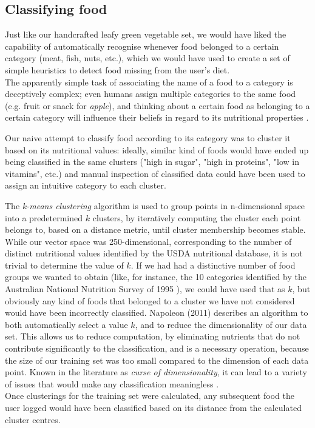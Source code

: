 \subsection{Classifying food}
Just like our handcrafted leafy green vegetable set, we would have liked the capability of automatically recognise whenever food belonged to a certain category (meat, fish, nuts, etc.), which we would have used to create a set of simple heuristics to detect food missing from the user's diet. \\
The apparently simple task of associating the name of a food to a category is deceptively complex; even humans assign multiple categories to the same food (e.g. fruit or snack for \textit{apple}), and thinking about a certain food as belonging to a certain category will influence their beliefs in regard to its nutritional properties \cite{Hayes2011}.

Our naive attempt to classify food  according to its category was to cluster it based on its nutritional values: ideally, similar kind of foods would have ended up being classified in the same clusters ("high in sugar", "high in proteins", "low in vitamins", etc.) and manual inspection of classified data could have been used to assign an intuitive category to each cluster. 

The \textit{k-means clustering} algorithm is used to group points in n-dimensional space into a predetermined $k$ clusters, by iteratively computing the cluster each point belongs to, based on a distance metric, until cluster membership becomes stable.\\
While our vector space was 250-dimensional, corresponding to the number of distinct nutritional values identified by the USDA nutritional database, it is not trivial to determine the value of $k$. If we had had a distinctive number of food groups we wanted to obtain (like, for instance, the 10 categories identified by the Australian National Nutrition Survey of 1995 \cite{NNS1995}), we could have used that as $k$, but obviously any kind of foods that belonged to a cluster we have not considered would have been incorrectly classified. Napoleon (2011)\cite{napoleon} describes an algorithm to both automatically select a value $k$, and to reduce the dimensionality of our data set. This allows us to reduce computation, by eliminating nutrients that do not contribute significantly to the classification, and is a necessary operation, because the size of our training set was too small compared to the dimension of each data point. Known in the literature as \textit{curse of dimensionality}, it can lead to a variety of issues that would make any classification meaningless \cite{kriegel2009}.\\
Once clusterings for the training set were calculated, any subsequent food the user logged would have been classified based on its distance from the calculated cluster centres.

